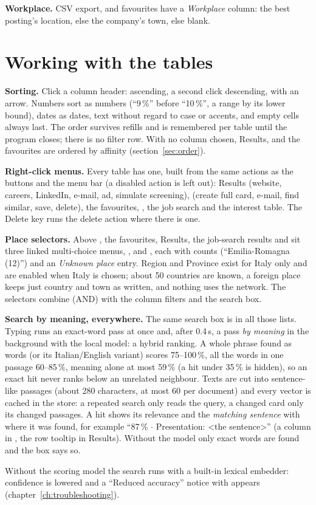 \textbf{Workplace.} CSV export,  and favourites have a \emph{Workplace}
column: the best posting's location, else the company's town, else blank.

\section{Working with the tables}\label{sec:tables}
\textbf{Sorting.} Click a column header: ascending, a second click descending, with an arrow.
Numbers sort as numbers (``9\,\%'' before ``10\,\%'', a range by its lower bound), dates as dates,
text without regard to case or accents, and empty cells always last. The order survives refills
and is remembered per table until the program closes; there is no filter row. With no column
chosen, Results,  and the favourites are ordered by affinity
(section~\ref{sec:order}).

\textbf{Right-click menus.} Every table has one, built from the same actions as the buttons and
the menu bar (a disabled action is left out): Results (website, careers, LinkedIn, e-mail, ad,
simulate screening),  (create full card, e-mail, find similar, save, delete),
the favourites, , the job search and the interest table. The Delete key runs
the delete action where there is one.

\textbf{Place selectors.} Above , the favourites, Results, the job-search
results and  sit three linked multi-choice menus, ,
 and , each with counts (``Emilia-Romagna (12)'') and an \emph{Unknown
place} entry. Region and Province exist for Italy only and are enabled when Italy is chosen;
about 50 countries are known, a foreign place keeps just country and town as written, and
nothing uses the network. The selectors combine (AND) with the column filters and the search box.

\textbf{Search by meaning, everywhere.} The same search box is in all those lists. Typing runs
an exact-word pass at once and, after 0.4\,s, a pass \emph{by meaning} in the background with the
local model: a hybrid ranking. A whole phrase found as words (or its Italian/English variant)
scores 75--100\,\%, all the words in one passage 60--85\,\%, meaning alone at most 59\,\% (a hit
under 35\,\% is hidden), so an exact hit never ranks below an unrelated neighbour. Texts are cut
into sentence-like passages (about 280 characters, at most 60 per document) and every vector is
cached in the store: a repeated search only reads the query, a changed card only its changed
passages. A hit shows its relevance and the \emph{matching sentence} with where it was found, for
example ``87\,\% $\cdot$ Presentation: <the sentence>'' (a  column in , the row tooltip in Results). Without the model only exact words are found and the box
says so.

\begin{warnbox}
Without the scoring model the search runs with a built-in lexical embedder: confidence is
lowered and a ``Reduced accuracy'' notice with  appears (chapter~\ref{ch:troubleshooting}).
\end{warnbox}
